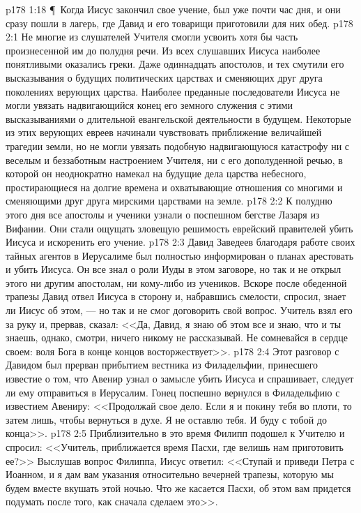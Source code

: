 \vs p178 1:18 \P\ Когда Иисус закончил свое учение, был уже почти час дня, и они сразу пошли в лагерь, где Давид и его товарищи приготовили для них обед.
\vs p178 2:1 Не многие из слушателей Учителя смогли усвоить хотя бы часть произнесенной им до полудня речи. Из всех слушавших Иисуса наиболее понятливыми оказались греки. Даже одиннадцать апостолов, и тех смутили его высказывания о будущих политических царствах и сменяющих друг друга поколениях верующих царства. Наиболее преданные последователи Иисуса не могли увязать надвигающийся конец его земного служения с этими высказываниями о длительной евангельской деятельности в будущем. Некоторые из этих верующих евреев начинали чувствовать приближение величайшей трагедии земли, но не могли увязать подобную надвигающуюся катастрофу ни с веселым и беззаботным настроением Учителя, ни с его дополуденной речью, в которой он неоднократно намекал на будущие дела царства небесного, простирающиеся на долгие времена и охватывающие отношения со многими и сменяющими друг друга мирскими царствами на земле.
\vs p178 2:2 К полудню этого дня все апостолы и ученики узнали о поспешном бегстве Лазаря из Вифании. Они стали ощущать зловещую решимость еврейский правителей убить Иисуса и искоренить его учение.
\vs p178 2:3 Давид Заведеев благодаря работе своих тайных агентов в Иерусалиме был полностью информирован о планах арестовать и убить Иисуса. Он все знал о роли Иуды в этом заговоре, но так и не открыл этого ни другим апостолам, ни кому\hyp{}либо из учеников. Вскоре после обеденной трапезы Давид отвел Иисуса в сторону и, набравшись смелости, спросил, знает ли Иисус об этом, --- но так и не смог договорить свой вопрос. Учитель взял его за руку и, прервав, сказал: <<Да, Давид, я знаю об этом все и знаю, что и ты знаешь, однако, смотри, ничего никому не рассказывай. Не сомневайся в сердце своем: воля Бога в конце концов восторжествует>>.
\vs p178 2:4 Этот разговор с Давидом был прерван прибытием вестника из Филадельфии, принесшего известие о том, что Авенир узнал о замысле убить Иисуса и спрашивает, следует ли ему отправиться в Иерусалим. Гонец поспешно вернулся в Филадельфию с известием Авениру: <<Продолжай свое дело. Если я и покину тебя во плоти, то затем лишь, чтобы вернуться в духе. Я не оставлю тебя. И буду с тобой до конца>>.
\vs p178 2:5 Приблизительно в это время Филипп подошел к Учителю и спросил: <<Учитель, приближается время Пасхи, где велишь нам приготовить ее?>> Выслушав вопрос Филиппа, Иисус ответил: <<Ступай и приведи Петра с Иоанном, и я дам вам указания относительно вечерней трапезы, которую мы будем вместе вкушать этой ночью. Что же касается Пасхи, об этом вам придется подумать после того, как сначала сделаем это>>.
